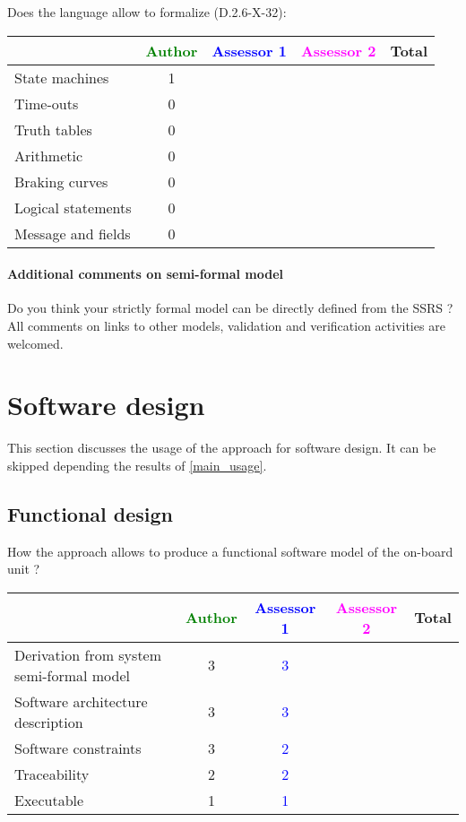 Does the language allow to formalize (D.2.6-X-32):

\begin{tabular}{|l | c | c | c | c|}
\hline
& \textcolor{green}{Author} & \textcolor{blue}{Assessor 1} & \textcolor{magenta}{Assessor 2} & Total \\
\hline
State machines & 1 & & & \\
\hline
Time-outs & 0 &  & & \\
\hline
Truth tables & 0 & & & \\
\hline
Arithmetic & 0 & & & \\
\hline
Braking curves & 0 & & & \\
\hline
Logical statements & 0 & & & \\
\hline
Message and fields & 0 & & & \\
\hline
\end{tabular}

\paragraph{Additional comments on semi-formal model} Do you think your strictly formal model can be directly defined from the SSRS ?
All comments on links to other models, validation and verification activities are welcomed.

\section{Software design}
This section discusses the usage of the approach for software design.
It can be skipped depending the results of \ref{main_usage}.

\subsection{Functional design}

How the approach allows to produce a functional software model of the on-board unit ?

\begin{tabular}{|l | c | c | c | c|}
\hline
& \textcolor{green}{Author} & \textcolor{blue}{Assessor 1} & \textcolor{magenta}{Assessor 2} & Total \\
\hline
Derivation from system semi-formal model & 3 & \textcolor{blue}{3} & & \\
\hline
Software architecture description & 3 & \textcolor{blue}{3} & & \\
\hline
Software constraints & 3 & \textcolor{blue}{2} & & \\
\hline
Traceability & 2 & \textcolor{blue}{2} & & \\
\hline
Executable & 1 & \textcolor{blue}{1} & & \\
\hline
\end{tabular}


